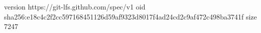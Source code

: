 version https://git-lfs.github.com/spec/v1
oid sha256:e18c4c2f2cc597168451126d59af9323d8017f4ad24cd2c9af472c498ba3741f
size 7247
